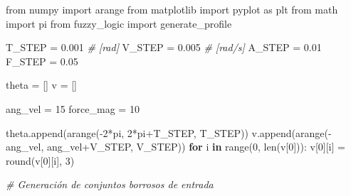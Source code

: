 \documentclass[onecolumn]{article}
\newenvironment{Shaded}{}{}
\newcommand{\BuiltInTok}[1]{#1}
\newcommand{\CommentTok}[1]{\textcolor[rgb]{0.38,0.63,0.69}{\textit{#1}}}
\newcommand{\ControlFlowTok}[1]{\textcolor[rgb]{0.00,0.44,0.13}{\textbf{#1}}}
\newcommand{\DecValTok}[1]{\textcolor[rgb]{0.25,0.63,0.44}{#1}}
\newcommand{\FloatTok}[1]{\textcolor[rgb]{0.25,0.63,0.44}{#1}}
\newcommand{\ImportTok}[1]{#1}
\newcommand{\KeywordTok}[1]{\textcolor[rgb]{0.00,0.44,0.13}{\textbf{#1}}}
\newcommand{\NormalTok}[1]{#1}
\newcommand{\OperatorTok}[1]{\textcolor[rgb]{0.40,0.40,0.40}{#1}}
\begin{document}
\begin{Shaded}
\begin{Highlighting}[]
\ImportTok{from}\NormalTok{ numpy }\ImportTok{import}\NormalTok{ arange}
\ImportTok{from}\NormalTok{ matplotlib }\ImportTok{import}\NormalTok{ pyplot }\ImportTok{as}\NormalTok{ plt}
\ImportTok{from}\NormalTok{ math }\ImportTok{import}\NormalTok{ pi}
\ImportTok{from}\NormalTok{ fuzzy_logic }\ImportTok{import}\NormalTok{ generate_profile}

\NormalTok{T_STEP }\OperatorTok{=} \FloatTok{0.001}      \CommentTok{# [rad]}
\NormalTok{V_STEP }\OperatorTok{=} \FloatTok{0.005}      \CommentTok{# [rad/s]}
\NormalTok{A_STEP }\OperatorTok{=} \FloatTok{0.01}
\NormalTok{F_STEP }\OperatorTok{=} \FloatTok{0.05}

\NormalTok{theta }\OperatorTok{=}\NormalTok{ []}
\NormalTok{v }\OperatorTok{=}\NormalTok{ []}

\NormalTok{ang_vel }\OperatorTok{=} \DecValTok{15}
\NormalTok{force_mag }\OperatorTok{=} \DecValTok{10}

\NormalTok{theta.append(arange(}\OperatorTok{-}\DecValTok{2}\OperatorTok{*}\NormalTok{pi, }\DecValTok{2}\OperatorTok{*}\NormalTok{pi}\OperatorTok{+}\NormalTok{T_STEP, T_STEP))}
\NormalTok{v.append(arange(}\OperatorTok{-}\NormalTok{ang_vel, ang_vel}\OperatorTok{+}\NormalTok{V_STEP, V_STEP))}
\ControlFlowTok{for}\NormalTok{ i }\KeywordTok{in} \BuiltInTok{range}\NormalTok{(}\DecValTok{0}\NormalTok{, }\BuiltInTok{len}\NormalTok{(v[}\DecValTok{0}\NormalTok{])):}
\NormalTok{    v[}\DecValTok{0}\NormalTok{][i] }\OperatorTok{=} \BuiltInTok{round}\NormalTok{(v[}\DecValTok{0}\NormalTok{][i], }\DecValTok{3}\NormalTok{)}

\CommentTok{# Generación de conjuntos borrosos de entrada}


\end{Highlighting}
\end{Shaded}
\end{document}
